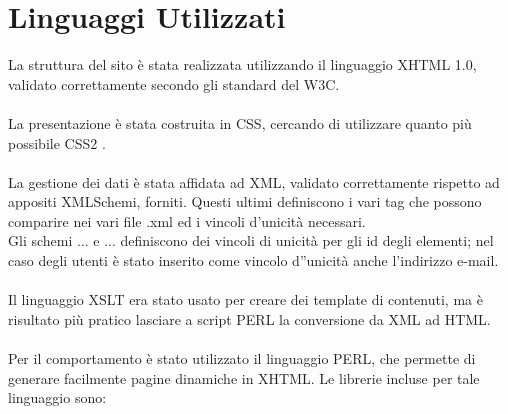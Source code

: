 \section{Linguaggi Utilizzati}{
	La struttura del sito è stata realizzata utilizzando il linguaggio XHTML 1.0, validato correttamente secondo gli standard del W3C. \\
	\\
	La presentazione è stata costruita in CSS, cercando di utilizzare quanto più possibile CSS2  %
	.\\
	\\
	La gestione dei dati è stata affidata ad XML, validato correttamente rispetto ad appositi XMLSchemi, forniti. Questi ultimi definiscono i vari tag che possono comparire nei vari file .xml ed i vincoli d'unicità necessari.\\
	Gli schemi ... e ... definiscono dei vincoli di unicità per gli id degli elementi; nel caso degli utenti è stato inserito come vincolo d''unicità anche l'indirizzo e-mail.\\
	\\
	Il linguaggio XSLT era stato usato per creare dei template di contenuti, ma è risultato più pratico lasciare a script PERL la conversione da XML ad HTML.\\
	\\
	Per il comportamento è stato utilizzato il linguaggio PERL, che permette di generare facilmente pagine dinamiche in XHTML. Le librerie incluse per tale linguaggio sono: %
}